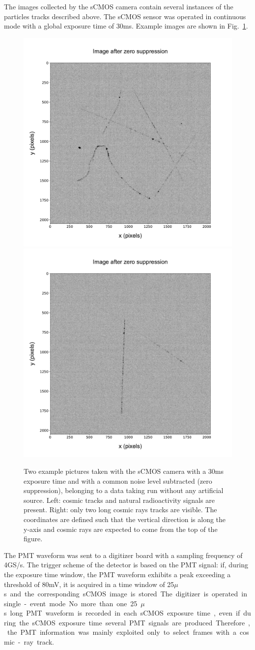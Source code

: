 \documentclass[12pt]{iopart}
\begin{document}
 The images collected by the sCMOS camera contain several instances of
 the particles tracks described above. The sCMOS sensor was operated
 in continuous mode with a global exposure time of
 30\unit{ms}. Example images are shown in
 Fig.~\ref{fig:typicalimage1}.

\begin{figure}[ht]
  \begin{center}
    \includegraphics[width=0.49\linewidth]{figures/pic_run02317_ev8_oriIma_paper}
    \includegraphics[width=0.49\linewidth]{figures/pic_run02156_ev527_oriIma_paper}
    \caption{Two example pictures taken with the sCMOS camera with a
      30\unit{ms} exposure time and with a common noise level
      subtracted (zero suppression), belonging to a data taking run
      without any artificial source. Left: cosmic tracks and natural
      radioactivity signals are present. Right: only two long cosmic
      rays tracks are visible. The coordinates are defined such that
      the vertical direction is along the y-axis and cosmic rays are
      expected to come from the top of the figure.
      \label{fig:typicalimage1}}
  \end{center}
\end{figure}

The PMT waveform was sent to a digitizer board with a sampling
frequency of 4\unit{GS/s}. The trigger scheme of the detector is based
on the PMT signal: if, during the exposure time window, the PMT
waveform exhibits a peak exceeding a threshold of 80\unit{mV}, it is
acquired in a time window of 25\unit{$\mu$s} and the corresponding
sCMOS image is stored.  The digitizer is operated in single-event
mode. No more than one 25\unit{$\mu$s} long PMT waveform is recorded
in each sCMOS exposure time, even if during the sCMOS exposure time
several PMT signals are produced.  Therefore, the PMT information was
mainly exploited only to select frames with a cosmic-ray track.
\end{document}
